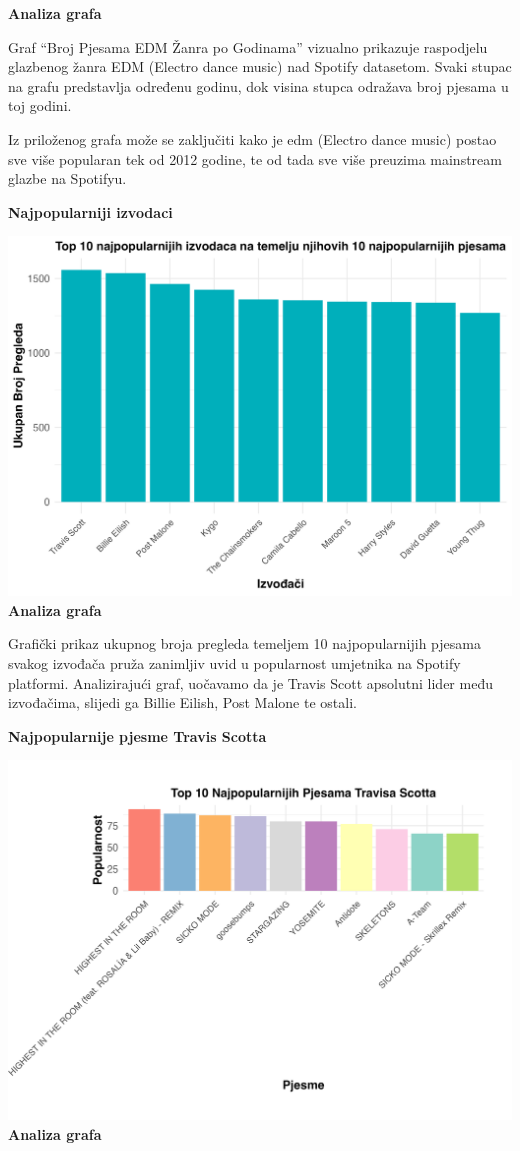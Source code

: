 \documentclass[
]{article}
\begin{document}
\textbf{Analiza grafa}

Graf ``Broj Pjesama EDM Žanra po Godinama'' vizualno prikazuje
raspodjelu glazbenog žanra EDM (Electro dance music) nad Spotify
datasetom. Svaki stupac na grafu predstavlja određenu godinu, dok visina
stupca odražava broj pjesama u toj godini.

Iz priloženog grafa može se zaključiti kako je edm (Electro dance music)
postao sve više popularan tek od 2012 godine, te od tada sve više
preuzima mainstream glazbe na Spotifyu.

\textbf{Najpopularniji izvodaci}

\includegraphics{najpopularniji_izvodaci.png} \textbf{Analiza grafa}

Grafički prikaz ukupnog broja pregleda temeljem 10 najpopularnijih
pjesama svakog izvođača pruža zanimljiv uvid u popularnost umjetnika na
Spotify platformi. Analizirajući graf, uočavamo da je Travis Scott
apsolutni lider među izvođačima, slijedi ga Billie Eilish, Post Malone
te ostali.

\textbf{Najpopularnije pjesme Travis Scotta}

\includegraphics{travis_scott.png} \textbf{Analiza grafa}
\end{document}
